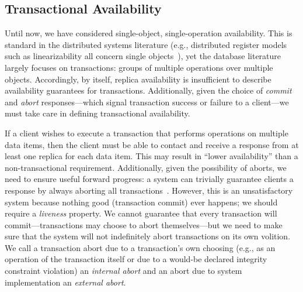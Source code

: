 
\subsection{Transactional Availability}

Until now, we have considered single-object, single-operation
availability. This is standard in the distributed systems literature
(e.g., distributed register models such as linearizability all concern
single objects~\cite{herlihy-art}), yet the database literature
largely focuses on transactions: groups of multiple operations over
multiple objects. Accordingly, by itself, replica availability is
insufficient to describe availability guarantees for
transactions. Additionally, given the choice of \textit{commit} and
\textit{abort} responses---which signal transaction success or failure
to a client---we must take care in defining transactional
availability.

If a client wishes to execute a transaction that performs operations
on multiple data items, then the client must be able to contact and
receive a response from at least one replica for each data item. This
may result in ``lower availability'' than a non-transactional
requirement. Additionally, given the possibility of aborts, we need to
ensure useful forward progress: a system can trivially guarantee
clients a response by always aborting all
transactions~\cite{transaction-liveness}. However, this is an
unsatisfactory system because nothing good (transaction commit) ever
happens; we should require a \textit{liveness} property. We cannot
guarantee that every transaction will commit---transactions may choose
to abort themselves---but we need to make sure that the system will
not indefinitely abort transactions on its own volition. We call a
transaction abort due to a transaction's own choosing (e.g., as an
operation of the transaction itself or due to a would-be declared
integrity constraint violation) an \textit{internal abort} and an
abort due to system implementation an \textit{external abort}.

